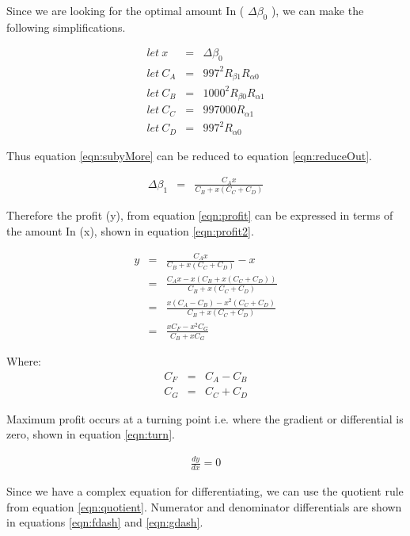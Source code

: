 \documentclass[runningheads]{llncs}
\begin{document}
	Since we are looking for the optimal amount In ( \(\Delta\beta_{0}\) ), we can make the following simplifications.
	
	\begin{eqnarray}
		let \: x &=& \Delta\beta_{0}\\
		let \: C_{A} &=& 997^2 R_{\beta 1}  R_{\alpha 0}\\
		let \: C_{B} &=& 1000^2 R_{\beta 0} R_{\alpha 1}\\
		let \: C_{C} &=& 997000  R_{\alpha 1}\\
		let \: C_{D} &=& 997^2  R_{\alpha 0}
	\end{eqnarray}
	
	Thus equation \ref{eqn:subyMore} can be reduced to equation \ref{eqn:reduceOut}.
	
	\begin{eqnarray}
		\Delta\beta_{1}  &=& \frac{C_{A} x}{C_{B} + x(C_{C} + C_{D})} \label{eqn:reduceOut}
	\end{eqnarray}
	
	Therefore the profit (y), from equation \ref{eqn:profit} can be expressed in terms of the amount In (x), shown in equation \ref{eqn:profit2}.
	
	\begin{eqnarray}
		y  &=& \frac{C_{A} x}{C_{B} + x(C_{C} + C_{D})} - x \label{eqn:profit2}\\
		&=& \frac{C_{A} x - x(C_{B} + x(C_{C} + C_{D}))}{C_{B} + x(C_{C} + C_{D})} \label{eqn:profit3}\\
		&=& \frac{x(C_{A} - C_{B}) - x^2(C_{C} + C_{D})}{C_{B} + x(C_{C} + C_{D})} \label{eqn:profit4}\\
		&=& \frac{x C_{F} - x^2 C_{G} }{C_{B} + x C_{G}} \label{eqn:profit5}
	\end{eqnarray}
	
	Where:
	\begin{eqnarray}
		C_{F}  &=& C_{A} - C_{B}\\
		C_{G}  &=& C_{C} + C_{D}
	\end{eqnarray}
	
	Maximum profit occurs at a turning point i.e. where the gradient or differential is zero, shown in equation \ref{eqn:turn}.
	
	\begin{eqnarray}
		\frac{dy}{dx} = 0 \label{eqn:turn}
	\end{eqnarray}
	
	Since we have a complex equation for differentiating, we can use the quotient rule from equation \ref{eqn:quotient}. Numerator and denominator differentials are shown in equations \ref{eqn:fdash} and \ref{eqn:gdash}.
	
\end{document}
